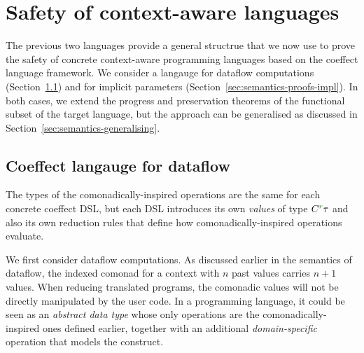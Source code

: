 %
%

\section{Safety of context-aware languages}
\label{sec:semantics-proofs}

The previous two languages provide a general structrue that we now use to prove the safety of 
concrete context-aware programming languages based on the coeffect language framework. We
consider a langauge for dataflow computations (Section~\ref{sec:semantics-proofs-df}) and
for implicit parameters (Section~\ref{sec:semantics-proofs-impl}). In both cases, we extend
the progress and preservation theorems of the functional subset of the target language, but the
approach can be generalised as discussed in Section~\ref{sec:semantics-generalising}.


\subsection{Coeffect langauge for dataflow}
\label{sec:semantics-proofs-df}

The types of the comonadically-inspired operations are the same for each concrete coeffect DSL, but
each DSL introduces its own \emph{values} of type $\ctyp{\cclrd{r}}\tau$ and also its own reduction
rules that define how comonadically-inspired operations evaluate.

We first consider dataflow computations. As discussed earlier in the
semantics of dataflow, the indexed comonad for a context with $n$ past values carries $n+1$ 
values. When reducing translated programs, the comonadic values will not be directly manipulated by the
user code. In a programming language, it could be seen as an \emph{abstract data type} whose only
operations are the comonadically-inspired ones defined earlier, together with an additional 
\emph{domain-specific} operation that models the  construct.

